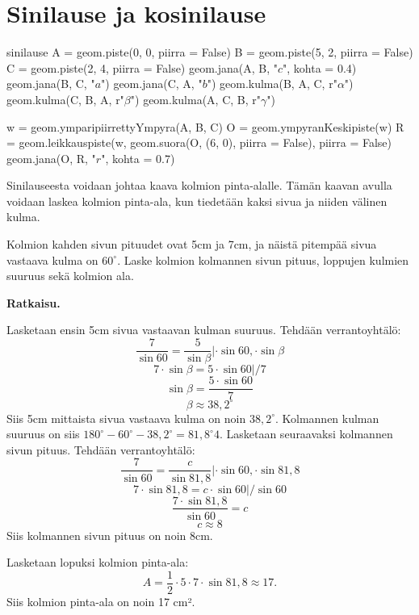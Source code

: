 \section*{Sinilause ja kosinilause}

\begin{luoKuva}{sinilause}
A = geom.piste(0, 0, piirra = False)
B = geom.piste(5, 2, piirra = False)
C = geom.piste(2, 4, piirra = False)
geom.jana(A, B, "$c$", kohta = 0.4)
geom.jana(B, C, "$a$")
geom.jana(C, A, "$b$")
geom.kulma(B, A, C, r"$\alpha$")
geom.kulma(C, B, A, r"$\beta$")
geom.kulma(A, C, B, r"$\gamma$")

w = geom.ymparipiirrettyYmpyra(A, B, C)
O = geom.ympyranKeskipiste(w)
R = geom.leikkauspiste(w, geom.suora(O, (6, 0), piirra = False), piirra = False)
geom.jana(O, R, "$r$", kohta = 0.7)
\end{luoKuva}


Sinilauseesta voidaan johtaa kaava kolmion pinta-alalle. Tämän kaavan avulla voidaan laskea kolmion pinta-ala, kun tiedetään kaksi sivua ja niiden välinen kulma.


\begin{esimerkki}
Kolmion kahden sivun pituudet ovat 5cm ja 7cm, ja näistä pitempää sivua vastaava kulma on $60^\circ$. Laske kolmion kolmannen sivun pituus, loppujen kulmien suuruus sekä kolmion ala.

\textbf{Ratkaisu.}

Lasketaan ensin 5cm sivua vastaavan kulman suuruus. Tehdään verrantoyhtälö:
$$\frac{7}{\sin 60} = \frac{5}{\sin \beta} | \cdot \sin 60, \cdot \sin \beta$$
$$7 \cdot \sin \beta = 5 \cdot \sin 60 | / 7$$
$$\sin \beta = \frac{5 \cdot \sin 60}{7}$$
$$\beta \approx 38,2^\circ$$
Siis 5cm mittaista sivua vastaava kulma on noin $38,2^\circ$. Kolmannen kulman suuruus on siis $180^\circ - 60^\circ -38,2^\circ = 81,8^\circ4$.
Lasketaan seuraavaksi kolmannen sivun pituus. Tehdään verrantoyhtälö:
$$\frac{7}{\sin 60} = \frac{c}{\sin 81,8}| \cdot \sin 60, \cdot \sin 81,8$$
$$7 \cdot \sin 81,8 = c \cdot \sin 60 | / \sin 60$$
$$\frac{7 \cdot \sin 81,8}{\sin 60} = c$$
$$c \approx 8$$
Siis kolmannen sivun pituus on noin 8cm.

Lasketaan lopuksi kolmion pinta-ala:
$$A = \frac{1}{2} \cdot 5 \cdot 7 \cdot \sin 81,8 \approx 17.$$
Siis kolmion pinta-ala on noin 17 cm².
\end{esimerkki}